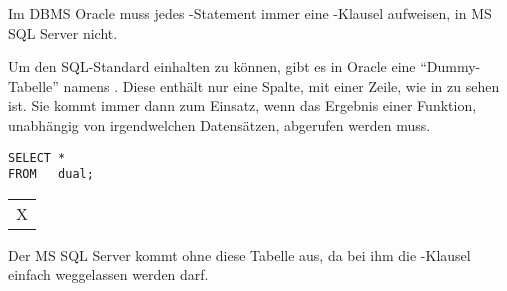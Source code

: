         \begin{merke}
          Im DBMS Oracle muss jedes \SELECT-Statement immer eine \FROM-Klausel
          aufweisen, in MS SQL Server nicht.
        \end{merke}
			 Um den SQL-Standard einhalten zu können, gibt es in Oracle eine \enquote{Dummy-Tabelle} namens . Diese enthält nur eine 		 Spalte, mit einer Zeile, wie in  zu sehen ist. Sie kommt immer dann zum Einsatz, wenn das Ergebnis einer Funktion, unabhängig von irgendwelchen Datensätzen, abgerufen werden muss.
        \begin{lstlisting}[language=oracle_sql,caption={Die Tabelle \identifier{dual} in Oracle},label=sql03_14]
SELECT *
FROM   dual;
        \end{lstlisting}
        \begin{center}
          \begin{small}
            \tablehead{}
            \begin{oraclesql}
              \begin{supertabular}{l}
                X \\
              \end{supertabular}
            \end{oraclesql}
          \end{small}
        \end{center}
        Der MS SQL Server kommt ohne diese Tabelle aus, da bei ihm die
        \FROM-Klausel einfach weggelassen werden darf.
